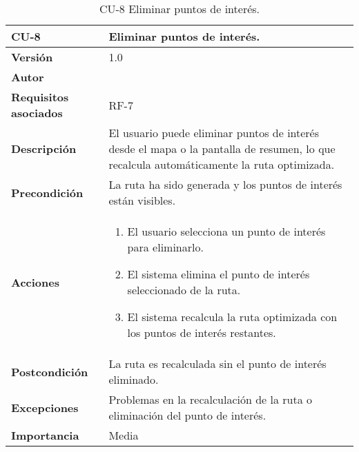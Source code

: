 \begin{table}[p]
	\centering
	\begin{tabularx}{\linewidth}{ p{} p{} }
		\toprule
		\textbf{CU-8}    & \textbf{Eliminar puntos de interés.}\\
		\toprule
		\textbf{Versión}              & 1.0    \\
		\textbf{Autor}                & \autor \\
		\textbf{Requisitos asociados} & RF-7 \\
		\textbf{Descripción}          & El usuario puede eliminar puntos de interés desde el mapa o la pantalla de resumen, lo que recalcula automáticamente la ruta optimizada. \\
		\textbf{Precondición}         & La ruta ha sido generada y los puntos de interés están visibles. \\
		\textbf{Acciones}             &
		\begin{enumerate}
			\def\labelenumi{\arabic{enumi}.}
			\tightlist
			\item El usuario selecciona un punto de interés para eliminarlo.
			\item El sistema elimina el punto de interés seleccionado de la ruta.
			\item El sistema recalcula la ruta optimizada con los puntos de interés restantes.
		\end{enumerate}\\
		\textbf{Postcondición}        & La ruta es recalculada sin el punto de interés eliminado. \\
		\textbf{Excepciones}          & Problemas en la recalculación de la ruta o eliminación del punto de interés. \\
		\textbf{Importancia}          & Media  \\
		\bottomrule
	\end{tabularx}
	\caption{CU-8 Eliminar puntos de interés.}
\end{table}

